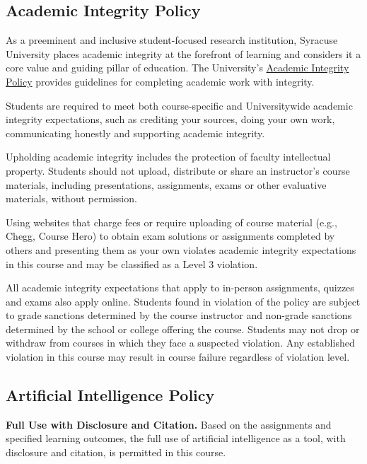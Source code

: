 \documentclass[11pt]{article}
\begin{document}
\subsection{Academic Integrity Policy}

As a preeminent and inclusive student-focused research institution, Syracuse University
places academic integrity at the forefront of learning and considers it a core value and
guiding pillar of education. The University's
\href{https://policies.syr.edu/policies/academic-rules-student-responsibilities-and-services/academic-integrity-policy/}{Academic Integrity Policy}
provides guidelines for completing academic work with integrity.

Students are required to meet both course-specific and Universitywide academic integrity
expectations, such as crediting your sources, doing your own work, communicating honestly and
supporting academic integrity.

Upholding academic integrity includes the protection of faculty intellectual property.
Students should not upload, distribute or share an instructor's course materials, including
presentations, assignments, exams or other evaluative materials, without permission.

Using websites that charge fees or require uploading of course material (e.g., Chegg, Course
Hero) to obtain exam solutions or assignments completed by others and presenting them as your
own violates academic integrity expectations in this course and may be classified as a Level
3 violation.

All academic integrity expectations that apply to in-person assignments, quizzes and exams
also apply online. Students found in violation of the policy are subject to grade sanctions
determined by the course instructor and non-grade sanctions determined by the school or
college offering the course. Students may not drop or withdraw from courses in which they face
a suspected violation. Any established violation in this course may result in course failure
regardless of violation level.

\subsection{Artificial Intelligence Policy}

\textbf{Full Use with Disclosure and Citation.} Based on the assignments and specified
learning outcomes, the full use of artificial intelligence as a tool, with disclosure and
citation, is permitted in this course.
\end{document}
